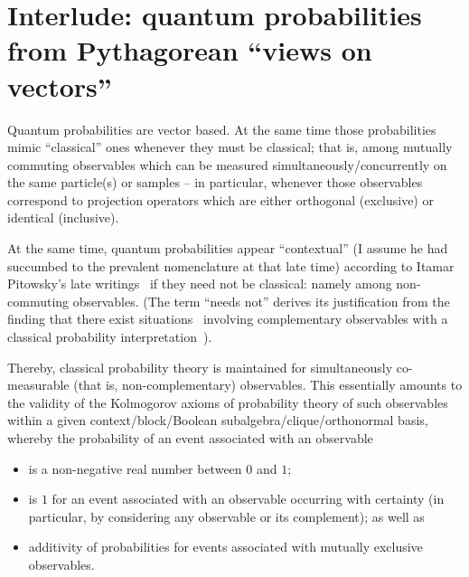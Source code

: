 \documentclass[%
  twocolumn,
 showpacs,
 showkeys,
 preprintnumbers,
 amsmath,amssymb,
 aps,
  pra,
  longbibliography,
 ]{revtex4-1}
\begin{document}
\section{Interlude: quantum probabilities from Pythagorean ``views on vectors''}

Quantum probabilities are vector based.
At the same time those probabilities mimic ``classical'' ones whenever they must be classical;
that is, among mutually commuting observables which can be measured simultaneously/concurrently on the same particle(s) or samples
--
in particular, whenever those observables correspond to projection operators which are either orthogonal (exclusive)
or identical (inclusive).

At the same time, quantum probabilities appear ``contextual'' (I assume he had succumbed to the prevalent nomenclature at that late time)
according to Itamar Pitowsky's late writings~\citep{pitowsky-06}
if they need not be classical: namely among non-commuting observables.
(The term ``needs not'' derives its justification from the finding that there exist
situations~\citep{e-f-moore,wright} involving complementary observables
with a classical probability interpretation~\citep{svozil-2001-eua}).

Thereby,
classical probability theory is maintained for simultaneously co-measurable
(that is, non-complementary) observables.
This essentially amounts to the validity of the Kolmogorov axioms of probability theory  of such observables within a given
context/block/Boolean subalgebra/clique/orthonormal basis, whereby the probability of an event associated with an observable
\begin{itemize}
\item
is a non-negative real number between $0$ and $1$;
\item
is $1$ for an event associated with an observable occurring with certainty (in particular, by considering any observable or its complement);
as well as
\item
additivity of probabilities for events associated with mutually exclusive observables.
\end{itemize}
\end{document}
